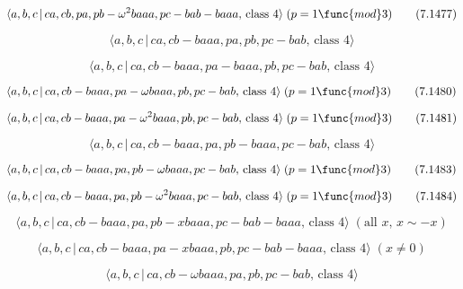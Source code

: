 \documentclass[10pt]{article}
\begin{document}
\begin{equation}
\langle a,b,c\,|\,ca,cb,pa,pb-\omega ^{2}baaa,pc-bab-baaa,\,\text{class }%
4\rangle \;(p=1\func{mod}3)  \tag{7.1477}
\end{equation}

\begin{equation}
\langle a,b,c\,|\,ca,cb-baaa,pa,pb,pc-bab,\,\text{class }4\rangle 
\tag{7.1478}
\end{equation}

\begin{equation}
\langle a,b,c\,|\,ca,cb-baaa,pa-baaa,pb,pc-bab,\,\text{class }4\rangle 
\tag{7.1479}
\end{equation}

\begin{equation}
\langle a,b,c\,|\,ca,cb-baaa,pa-\omega baaa,pb,pc-bab,\,\text{class }%
4\rangle \;(p=1\func{mod}3)  \tag{7.1480}
\end{equation}

\begin{equation}
\langle a,b,c\,|\,ca,cb-baaa,pa-\omega ^{2}baaa,pb,pc-bab,\,\text{class }%
4\rangle \;(p=1\func{mod}3)  \tag{7.1481}
\end{equation}

\begin{equation}
\langle a,b,c\,|\,ca,cb-baaa,pa,pb-baaa,pc-bab,\,\text{class }4\rangle 
\tag{7.1482}
\end{equation}

\begin{equation}
\langle a,b,c\,|\,ca,cb-baaa,pa,pb-\omega baaa,pc-bab,\,\text{class }%
4\rangle \;(p=1\func{mod}3)  \tag{7.1483}
\end{equation}

\begin{equation}
\langle a,b,c\,|\,ca,cb-baaa,pa,pb-\omega ^{2}baaa,pc-bab,\,\text{class }%
4\rangle \;(p=1\func{mod}3)  \tag{7.1484}
\end{equation}

\begin{equation}
\langle a,b,c\,|\,ca,cb-baaa,pa,pb-xbaaa,pc-bab-baaa,\,\text{class }4\rangle
\;(\text{all }x,\,x\sim -x)  \tag{7.1485}
\end{equation}

\begin{equation}
\langle a,b,c\,|\,ca,cb-baaa,pa-xbaaa,pb,pc-bab-baaa,\,\text{class }4\rangle
\;(x \neq 0)  \tag{7.1486}
\end{equation}

\begin{equation}
\langle a,b,c\,|\,ca,cb-\omega baaa,pa,pb,pc-bab,\,\text{class }4\rangle 
\tag{7.1487}
\end{equation}
\end{document}
